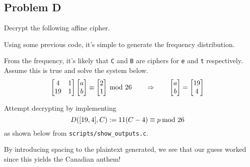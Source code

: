 \documentclass[../hw_sols.tex]{subfiles}
\begin{document}
\newpage



\subsection*{Problem D}

Decrypt the following affine cipher.

\begin{solution}

Using some previous code, it's simple to generate the frequency distribution.


From the frequency, it's likely that \verb|C| and \verb|B| are ciphers for 
\verb|e| and \verb|t| respectively. Assume this is true and solve the system 
below.
	\[ \begin{bmatrix} 4 & 1 \\ 19 & 1 \end{bmatrix}
	\begin{bmatrix} a \\ b \end{bmatrix}
	\equiv
	\begin{bmatrix} 2 \\ 1 \end{bmatrix} \tmod{26} 
	\qquad \Rightarrow \qquad
	\begin{bmatrix} a \\ b \end{bmatrix}
	= 
	\begin{bmatrix} 19 \\ 4 \end{bmatrix} \]

Attempt decrypting by implementing 
	\[ D([19,4],C) := 11(C-4) \equiv p \tmod{26} \]
as shown below from \verb|scripts/show_outputs.c|.



By introducing spacing to the plaintext generated, we see that our guess 
worked since this yields the Canadian anthem!

\end{solution}
\end{document}
